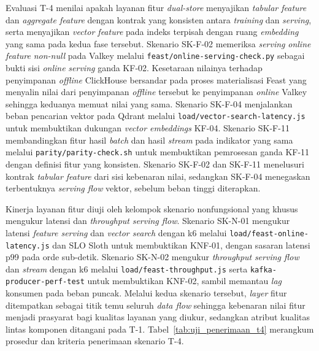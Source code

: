 Evaluasi T-4 menilai apakah layanan fitur \textit{dual-store} menyajikan \textit{tabular feature} dan \textit{aggregate feature} dengan kontrak yang konsisten antara \textit{training} dan \textit{serving}, serta menyajikan \textit{vector feature} pada indeks terpisah dengan ruang \textit{embedding} yang sama pada kedua fase tersebut. Skenario SK-F-02 memeriksa \textit{serving} \textit{online feature} \textit{non-null} pada Valkey melalui \texttt{feast/}\allowbreak\texttt{online-serving-check.py} sebagai bukti sisi \textit{online} \textit{serving} ganda KF-02. Kesetaraan nilainya terhadap penyimpanan \textit{offline} ClickHouse bersandar pada proses materialisasi Feast yang menyalin nilai dari penyimpanan \textit{offline} tersebut ke penyimpanan \textit{online} Valkey sehingga keduanya memuat nilai yang sama. Skenario SK-F-04 menjalankan beban pencarian vektor pada Qdrant melalui \texttt{load/}\allowbreak\texttt{vector-search-latency.js} untuk membuktikan dukungan \textit{vector embeddings} KF-04. Skenario SK-F-11 membandingkan fitur hasil \textit{batch} dan hasil \textit{stream} pada indikator yang sama melalui \texttt{parity/}\allowbreak\texttt{parity-check.sh} untuk membuktikan pemrosesan ganda KF-11 dengan definisi fitur yang konsisten. Skenario SK-F-02 dan SK-F-11 menelusuri kontrak \textit{tabular feature} dari sisi kebenaran nilai, sedangkan SK-F-04 menegaskan terbentuknya \textit{serving flow} vektor, sebelum beban tinggi diterapkan.

Kinerja layanan fitur diuji oleh kelompok skenario nonfungsional yang khusus mengukur latensi dan \textit{throughput} \textit{serving flow}. Skenario SK-N-01 mengukur latensi \textit{feature serving} dan \textit{vector search} dengan k6 melalui \texttt{load/}\allowbreak\texttt{feast-online-latency.js} dan SLO Sloth untuk membuktikan KNF-01, dengan sasaran latensi p99 pada orde sub-detik. Skenario SK-N-02 mengukur \textit{throughput} \textit{serving flow} dan \textit{stream} dengan k6 melalui \texttt{load/}\allowbreak\texttt{feast-throughput.js} serta \texttt{kafka-producer-perf-test} untuk membuktikan KNF-02, sambil memantau \textit{lag} konsumen pada beban puncak. Melalui kedua skenario tersebut, \textit{layer} fitur ditempatkan sebagai titik temu seluruh \textit{data flow} sehingga kebenaran nilai fitur menjadi prasyarat bagi kualitas layanan yang diukur, sedangkan atribut kualitas lintas komponen ditangani pada T-1. Tabel~\ref{tab:uji_penerimaan_t4} merangkum prosedur dan kriteria penerimaan skenario T-4.



